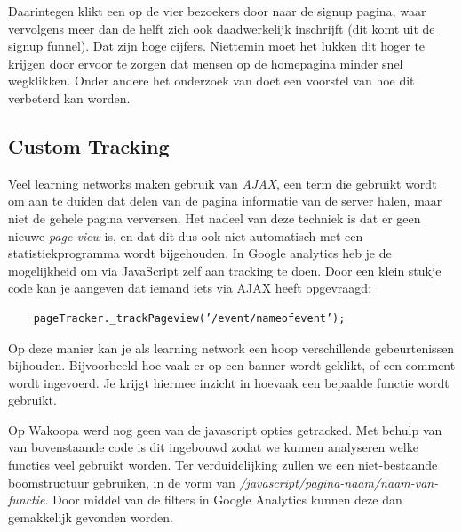 \documentclass[a4paper, 10pt, pdftex]{report}
\begin{document}
    Daarintegen klikt een op de vier bezoekers door naar de signup pagina, waar vervolgens meer dan de helft zich ook daadwerkelijk inschrijft (dit komt uit de signup funnel). Dat zijn hoge cijfers. Niettemin moet het lukken dit hoger te krijgen door ervoor te zorgen dat mensen op de homepagina minder snel wegklikken. Onder andere het onderzoek van \cite{Hoekman2008} doet een voorstel van hoe dit verbeterd kan worden.

    \subsection{Custom Tracking}
    Veel learning networks maken gebruik van \emph{AJAX}, een term die gebruikt wordt om aan te duiden dat delen van de pagina informatie van de server halen, maar niet de gehele pagina verversen. Het nadeel van deze techniek is dat er geen nieuwe \emph{page view} is, en dat dit dus ook niet automatisch met een statistiekprogramma wordt bijgehouden. In Google analytics heb je de mogelijkheid om via JavaScript zelf aan tracking te doen. Door een klein stukje code kan je aangeven dat iemand iets via AJAX heeft opgevraagd:
    \begin{verbatim}
    pageTracker._trackPageview(’/event/nameofevent’);
    \end{verbatim}
    Op deze manier kan je als learning network een hoop verschillende gebeurtenissen bijhouden. Bijvoorbeeld hoe vaak er op een banner wordt geklikt, of een comment wordt ingevoerd. Je krijgt hiermee inzicht in hoevaak een bepaalde functie wordt gebruikt.

    Op Wakoopa werd nog geen van de javascript opties getracked. Met behulp van van bovenstaande code is dit ingebouwd zodat we kunnen analyseren welke functies veel gebruikt worden. Ter verduidelijking zullen we een niet-bestaande boomstructuur gebruiken, in de vorm van \emph{/javascript/pagina-naam/naam-van-functie}. Door middel van de filters in Google Analytics kunnen deze dan gemakkelijk gevonden worden.
\end{document}
